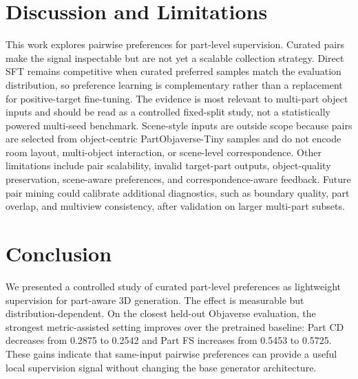 \documentclass[10pt,twocolumn,letterpaper]{article}
\begin{document}
\section{Discussion and Limitations}
This work explores pairwise preferences for part-level supervision. Curated pairs make the signal inspectable but are not yet a scalable collection strategy. Direct SFT remains competitive when curated preferred samples match the evaluation distribution, so preference learning is complementary rather than a replacement for positive-target fine-tuning. The evidence is most relevant to multi-part object inputs and should be read as a controlled fixed-split study, not a statistically powered multi-seed benchmark. Scene-style inputs are outside scope because pairs are selected from object-centric PartObjaverse-Tiny samples and do not encode room layout, multi-object interaction, or scene-level correspondence. Other limitations include pair scalability, invalid target-part outputs, object-quality preservation, scene-aware preferences, and correspondence-aware feedback. Future pair mining could calibrate additional diagnostics, such as boundary quality, part overlap, and multiview consistency, after validation on larger multi-part subsets.

\FloatBarrier

\section{Conclusion}
We presented a controlled study of curated part-level preferences as lightweight supervision for part-aware 3D generation. The effect is measurable but distribution-dependent. On the closest held-out Objaverse evaluation, the strongest metric-assisted setting improves over the pretrained baseline: Part CD decreases from 0.2875 to 0.2542 and Part FS increases from 0.5453 to 0.5725.
These gains indicate that same-input pairwise preferences can provide a useful local supervision signal without changing the base generator architecture.
\end{document}
